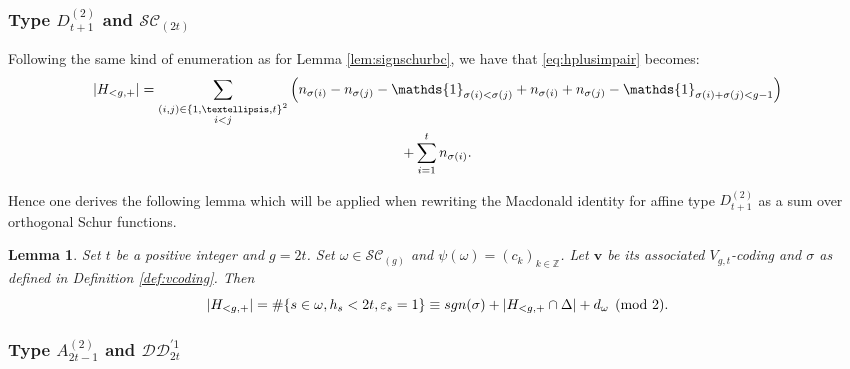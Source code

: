 \documentclass[11pt,letterpaper]{amsart}
\def\bbbz{\mathbb Z}
\def\ccsc{\mathcal {SC}}
\def\ccdd{\mathcal {DD}}
\def\sgn{{\rm sgn}}
\newtheorem{lm}[df]{Lemma}
\numberwithin{equation}{section}
\numberwithin{df}{section}
\begin{document}
\subsubsection{Type $D^{(2)}_{t+1}$ and $\ccsc_{(2t)}$}


Following the same kind of enumeration as for Lemma \ref{lem:signschurbc}, we have that \eqref{eq:hplusimpair} becomes:
\begin{multline}\label{eq:hplussc}
\lvert H_{<g,+}\rvert=\sum_{\substack{(i,j)\in \lbrace 1,\dots ,t\rbrace^2\\i<j}}\left(n_{\sigma(i)}-n_{\sigma(j)}-\mathds{1}_{\sigma(i)<\sigma(j)}+n_{\sigma(i)}+n_{\sigma(j)}-\mathds{1}_{\sigma(i)+\sigma(j)<g-1}\right)\\
+\sum_{i=1}^t n_{\sigma(i)}.\notag
\end{multline}

Hence	 one derives the following lemma which will be applied when rewriting the Macdonald identity for affine type $D^{(2)}_{t+1}$ as a sum over orthogonal Schur functions.
\begin{lm}\label{lem:signschursc}
Set $t$ be a positive integer and $g=2t$.
Set $\omega\in\ccsc_{(g)}$ and $\psi(\omega)=(c_k)_{k\in\bbbz}$. 
Let $\mathbf{v}$ be its associated $V_{g,t}$-coding and $\sigma$ as defined in Definition \ref{def:vcoding}. Then
\begin{equation}
\lvert H_{<g,+}\rvert=\#\lbrace s\in\omega, h_s<2t, \varepsilon_s=1\rbrace\equiv \sgn(\sigma)+\lvert H_{<g,+}\cap \Delta\rvert+d_\omega\pmod{2}.
\end{equation}
\end{lm}


\subsubsection{Type $A^{(2)}_{2t-1}$ and $\ccdd_{2t}^{'1}$}
\end{document}
